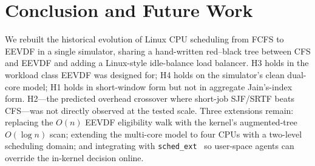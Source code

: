\documentclass[conference]{IEEEtran}
\begin{document}
\section{Conclusion and Future Work}
\label{sec:conclusion}

We rebuilt the historical evolution of Linux CPU scheduling from FCFS
to EEVDF in a single simulator, sharing a hand-written red--black
tree between CFS and EEVDF and adding a Linux-style idle-balance load
balancer. H3 holds in the workload class EEVDF was designed for; H4
holds on the simulator's clean dual-core model; H1 holds in
short-window form but not in aggregate Jain's-index form. H2---the
predicted overhead crossover where short-job SJF/SRTF beats CFS---was
not directly observed at the tested scale. Three extensions remain:
replacing the $O(n)$ EEVDF eligibility walk with the kernel's
augmented-tree $O(\log n)$ scan; extending the multi-core model to
four CPUs with a two-level scheduling domain; and integrating with
\texttt{sched\_ext}~\cite{linux_schedext_doc_2024} so user-space
agents can override the in-kernel decision online.



\end{document}
